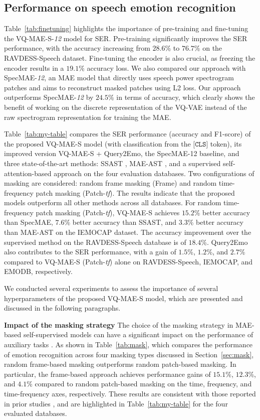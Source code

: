 \documentclass{article}
\newcommand{\myparagraph}[1]{\noindent\textbf{#1}\hspace{.25cm}}
\begin{document}
\subsection{Performance on speech emotion recognition}
Table~\ref{tab:finetuning} highlights the importance of pre-training and fine-tuning the VQ-MAE-S-\emph{12} model for SER. Pre-training significantly improves the SER performance, with the accuracy increasing from $28.6$\% to $76.7$\% on the RAVDESS-Speech dataset. Fine-tuning the encoder is also crucial, as freezing the encoder results in a $19.1$\% accuracy loss. We also compared our approach with SpecMAE-\emph{12}, an MAE model that directly uses speech power spectrogram patches and aims to reconstruct masked patches using L2 loss. Our approach outperforms SpecMAE-\emph{12} by $24.5$\% in terms of accuracy, which clearly shows the benefit of working on the discrete representation of the VQ-VAE instead of the raw spectrogram representation for training the MAE.

Table~\ref{tab:my-table} compares the SER performance (accuracy and F1-score) of the proposed VQ-MAE-S model (with classification from the $\texttt{[CLS]}$ token), its improved version VQ-MAE-S + Query2Emo, the SpecMAE-12 baseline, and three state-of-the-art methods: SSAST \cite{gong2022ssast}, MAE-AST \cite{baade2022mae}, and a supervised self-attention-based approach \cite{chumachenko2022self} on the four evaluation databases. Two configurations of masking are considered: random frame masking (Frame) and random time-frequency patch masking (Patch-\emph{tf}). The results indicate that the proposed models outperform all other methods across all databases.
For random time-frequency patch masking (Patch-\emph{tf}), VQ-MAE-S achieves $15.2$\% better accuracy than SpecMAE, $7.6$\% better accuracy than SSAST, and $3.3$\% better accuracy than MAE-AST on the IEMOCAP dataset. The accuracy improvement over the supervised method on the RAVDESS-Speech database is of $18.4$\%. Query2Emo also contributes to the SER performance, with a gain of $1.5$\%, $1.2$\%, and $2.7$\% compared to VQ-MAE-S (Patch-\emph{tf}) alone on RAVDESS-Speech, IEMOCAP, and EMODB, respectively.

We conducted several experiments to assess the importance of several hyperparameters of the proposed VQ-MAE-S model, which are presented and discussed in the following paragraphs.

\myparagraph{Impact of the masking strategy} The choice of the masking strategy in MAE-based self-supervised models can have a significant impact on the performance of auxiliary tasks \cite{he2022masked}. As shown in Table~\ref{tab:mask}, which compares the performance of emotion recognition across four masking types discussed in Section~\ref{sec:mask}, random frame-based masking outperforms random patch-based masking. In particular, the frame-based approach achieves performance gains of $15.1$\%, $12.3$\%, and $4.1$\% compared to random patch-based masking on the time, frequency, and time-frequency axes, respectively. These results are consistent with those reported in prior studies \cite{gong2022ssast, baade2022mae}, and are highlighted in Table~\ref{tab:my-table} for the four evaluated databases.
\end{document}
